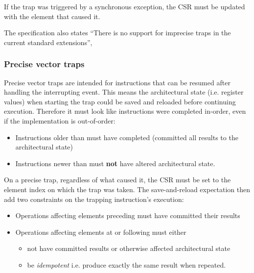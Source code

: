 If the trap was triggered by a synchronous exception, the  CSR must be updated with the element that caused it.

The specification also states \enquote{There is no support for imprecise traps in the current standard extensions}, 

\subsubsection{Precise vector traps}
Precise vector traps are intended for instructions that can be resumed after handling the interrupting event.
This means the architectural state (i.e. register values) when starting the trap could be saved and reloaded before continuing execution.
Therefore it must look like instructions were completed in-order, even if the implementation is out-of-order:
\begin{itemize}
    \item Instructions older than  must have completed (committed all results to the architectural state)
    \item Instructions newer than  must \textbf{not} have altered architectural state.
\end{itemize}

On a precise trap, regardless of what caused it, the  CSR must be set to the element index on which the trap was taken.
The save-and-reload expectation then add two constraints on the trapping instruction's execution:
\begin{itemize}
    \item Operations affecting elements preceding  must have committed their results
    \item Operations affecting elements at or following  must either
    \begin{itemize}
        \item not have committed results or otherwise affected architectural state
        \item be \emph{idempotent} i.e. produce exactly the same result when repeated.
    \end{itemize}
\end{itemize}

